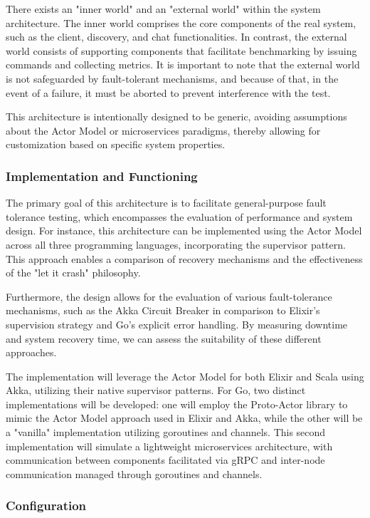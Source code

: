 There exists an "inner world" and an "external world" within the system architecture. The inner world comprises the core components of the real system, such as the client, discovery, and chat functionalities. In contrast, the external world consists of supporting components that facilitate benchmarking by issuing commands and collecting metrics. It is important to note that the external world is not safeguarded by fault-tolerant mechanisms, and because of that, in the event of a failure, it must be aborted to prevent interference with the test.

This architecture is intentionally designed to be generic, avoiding assumptions about the Actor Model or microservices paradigms, thereby allowing for customization based on specific system properties.

\subsubsection{Implementation and Functioning}

The primary goal of this architecture is to facilitate general-purpose fault tolerance testing, which encompasses the evaluation of performance and system design. For instance, this architecture can be implemented using the Actor Model across all three programming languages, incorporating the supervisor pattern. This approach enables a comparison of recovery mechanisms and the effectiveness of the "let it crash" philosophy.

Furthermore, the design allows for the evaluation of various fault-tolerance mechanisms, such as the Akka Circuit Breaker in comparison to Elixir’s supervision strategy and Go's explicit error handling. By measuring downtime and system recovery time, we can assess the suitability of these different approaches.

The implementation will leverage the Actor Model for both Elixir and Scala using Akka, utilizing their native supervisor patterns. For Go, two distinct implementations will be developed: one will employ the Proto-Actor library to mimic the Actor Model approach used in Elixir and Akka, while the other will be a "vanilla" implementation utilizing goroutines and channels. This second implementation will simulate a lightweight microservices architecture, with communication between components facilitated via \gls{gRPC} and inter-node communication managed through goroutines and channels.

\subsubsection{Configuration}


